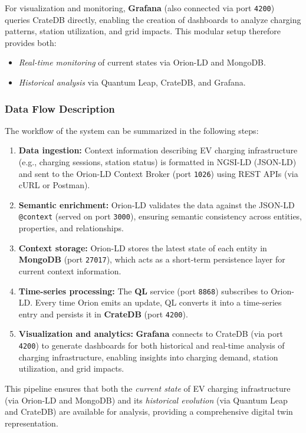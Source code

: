 For visualization and monitoring, \textbf{Grafana} (also connected via
port \texttt{4200}) queries CrateDB directly, enabling the creation of
dashboards to analyze charging patterns, station utilization, and grid
impacts. This modular setup therefore provides both:
\begin{itemize}
  \item \emph{Real-time monitoring} of current states via Orion-LD and MongoDB.
  \item \emph{Historical analysis} via Quantum Leap, CrateDB, and Grafana.
\end{itemize}

\subsubsection*{Data Flow Description}

The workflow of the system can be summarized in the following steps:

\begin{enumerate}
  \item \textbf{Data ingestion:} Context information describing EV
  charging infrastructure (e.g., charging sessions, station status) is
  formatted in NGSI-LD (JSON-LD) and sent to the Orion-LD Context
  Broker (port \texttt{1026}) using REST APIs (via cURL or Postman).
  \item \textbf{Semantic enrichment:} Orion-LD validates the data against
  the JSON-LD \texttt{@context} (served on port \texttt{3000}), ensuring
  semantic consistency across entities, properties, and relationships.
  \item \textbf{Context storage:} Orion-LD stores the latest state of each
  entity in \textbf{MongoDB} (port \texttt{27017}), which acts as a
  short-term persistence layer for current context information.
  \item \textbf{Time-series processing:} The \textbf{QL}
  service (port \texttt{8868}) subscribes to Orion-LD. Every time Orion
  emits an update, QL converts it into a time-series entry and persists it
  in \textbf{CrateDB} (port \texttt{4200}).
  \item \textbf{Visualization and analytics:} \textbf{Grafana} connects to
  CrateDB (via port \texttt{4200}) to generate dashboards for both
  historical and real-time analysis of charging infrastructure, enabling
  insights into charging demand, station utilization, and grid impacts.
\end{enumerate}

This pipeline ensures that both the \emph{current state} of EV charging
infrastructure (via Orion-LD and MongoDB) and its \emph{historical
evolution} (via Quantum Leap and CrateDB) are available for analysis,
providing a comprehensive digital twin representation.

